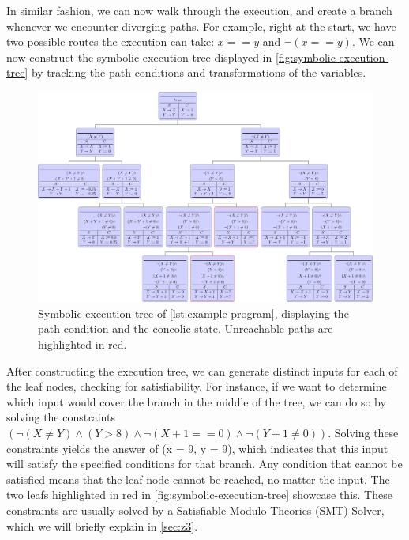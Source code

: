 In similar fashion, we can now walk through the execution, and create a branch whenever we encounter diverging paths.
For example, right at the start, we have two possible routes the execution can take: $x == y$ and $\neg(x == y)$.
We can now construct the symbolic execution tree displayed in \autoref{fig:symbolic-execution-tree} by tracking the path conditions and transformations of the variables.

\begin{figure}
  \centering
  \includegraphics[width=\textwidth]{../luatex/symexe/out/symexe.pdf}    
  \caption[Symbolic execution tree]{Symbolic execution tree of \autoref{lst:example-program}, displaying the path condition and the concolic state. Unreachable paths are highlighted in red.}
  \label{fig:symbolic-execution-tree}
\end{figure}




After constructing the execution tree, we can generate distinct inputs for each of the leaf nodes, checking for satisfiability.
For instance, if we want to determine which input would cover the branch in the middle of the tree, we can do so by solving the constraints  $(\neg(X \neq Y) \land (Y > 8) \land \neg( X+1==0 ) \land \neg(Y+1 \neq 0 ))$. 
Solving these constraints yields the answer of (x = 9, y = 9), which indicates that this input will satisfy the specified conditions for that branch. 
Any condition that cannot be satisfied means that the leaf node cannot be reached, no matter the input. The two leafs highlighted in red in  \autoref{fig:symbolic-execution-tree} showcase this.
These constraints are usually solved by a Satisfiable Modulo Theories (SMT) Solver, which we will briefly explain in \autoref{sec:z3}.


